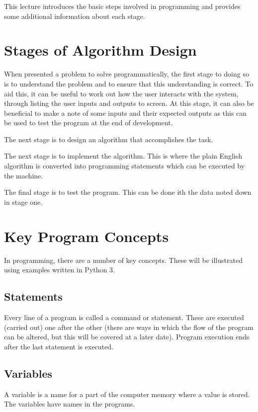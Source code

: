 
This lecture introduces the basic steps involved in programming and provides some additional information about each stage.

\section*{Stages of Algorithm Design}
When presented a problem to solve programmatically, the first stage to doing so is to understand the problem and to ensure that this understanding is correct.
To aid this, it can be useful to work out how the user interacts with the system, through listing the user inputs and outputs to screen. At this stage, it can also be beneficial to make a note of some inputs and their expected outputs as this can be used to test the program at the end of development.

The next stage is to design an algorithm that accomplishes the task.

The next stage is to implement the algorithm. This is where the plain English algorithm is converted into programming statements which can be executed by the machine.

The final stage is to test the program. This can be done ith the data noted down in stage one.

\section*{Key Program Concepts}
In programming, there are a number of key concepts. These will be illustrated using examples written in Python 3.

\subsection*{Statements}
Every line of a program is called a command or statement. These are executed (carried out) one after the other (there are ways in which the flow of the program can be altered, but this will be covered at a later date). Program execution ends after the last statement is executed.
\subsection*{Variables}
A variable is a name for a part of the computer memory where a value is stored. The variables have names in the programs.

